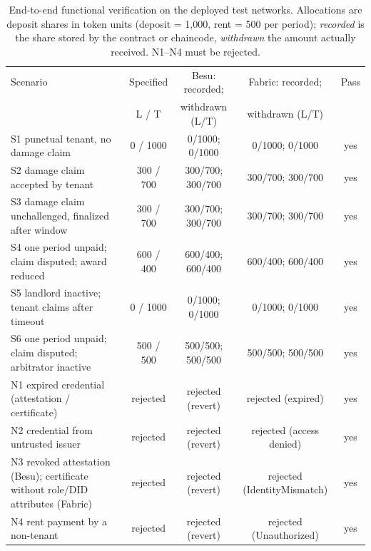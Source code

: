 \begin{table}[t]
\centering
\scriptsize
\caption{End-to-end functional verification on the deployed test networks. Allocations are deposit shares in token units (deposit = 1{,}000, rent = 500 per period); \emph{recorded} is the share stored by the contract or chaincode, \emph{withdrawn} the amount actually received. N1--N4 must be rejected.}
\label{tab:e2e}
\begin{tabularx}{\textwidth}{@{}>{\raggedright}Xcccc@{}}
\toprule
Scenario & Specified & Besu: recorded; & Fabric: recorded; & Pass \\
 & L / T & withdrawn (L/T) & withdrawn (L/T) & \\
\midrule
S1 punctual tenant, no damage claim & 0 / 1000 & 0/1000; 0/1000 & 0/1000; 0/1000 & yes \\
S2 damage claim accepted by tenant & 300 / 700 & 300/700; 300/700 & 300/700; 300/700 & yes \\
S3 damage claim unchallenged, finalized after window & 300 / 700 & 300/700; 300/700 & 300/700; 300/700 & yes \\
S4 one period unpaid; claim disputed; award reduced & 600 / 400 & 600/400; 600/400 & 600/400; 600/400 & yes \\
S5 landlord inactive; tenant claims after timeout & 0 / 1000 & 0/1000; 0/1000 & 0/1000; 0/1000 & yes \\
S6 one period unpaid; claim disputed; arbitrator inactive & 500 / 500 & 500/500; 500/500 & 500/500; 500/500 & yes \\
N1 expired credential (attestation / certificate) & rejected & rejected (revert) & rejected (expired) & yes \\
N2 credential from untrusted issuer & rejected & rejected (revert) & rejected (access denied) & yes \\
N3 revoked attestation (Besu); certificate without role/DID attributes (Fabric) & rejected & rejected (revert) & rejected (IdentityMismatch) & yes \\
N4 rent payment by a non-tenant & rejected & rejected (revert) & rejected (Unauthorized) & yes \\
\bottomrule
\end{tabularx}
\end{table}
